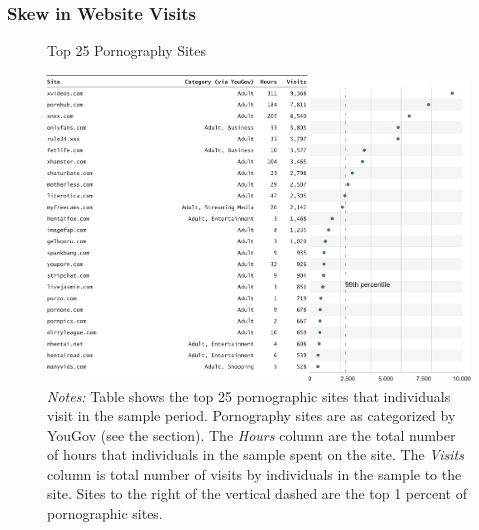 \documentclass[12pt, letterpaper]{article}
\begin{document}
\subsubsection{Skew in Website Visits}
\begin{figure}[ht]
	\centering
	\caption{Top 25 Pornography Sites}
	\includegraphics[width=\textwidth]{../figs/top_25_adultsites.pdf}
	\caption*{\footnotesize \emph{Notes:} 
		Table shows the top 25 pornographic sites that individuals visit in the sample period.
		Pornography sites are as categorized by YouGov (see the  section).
		The \emph{Hours} column are the total number of hours that individuals in the sample spent on the site. 
		The \emph{Visits} column is total number of visits by individuals in the sample to the site.  
		Sites to the right of the vertical dashed are the top 1 percent of pornographic sites.
	}
	\label{fig:top25_adult}
\end{figure}
\end{document}
